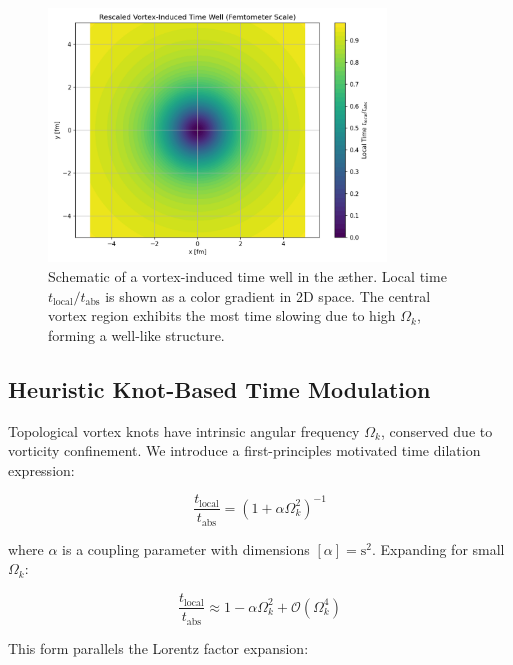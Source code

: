 \begin{figure}[htbp]
    \centering
    \includegraphics[width=0.8\textwidth]{RadialProfileOfLocalTimeDilation_Vortex-Induced_Time_Well}
    \caption{Schematic of a vortex-induced time well in the æther. Local time $t_{\text{local}} / t_{\text{abs}}$ is shown as a color gradient in 2D space. The central vortex region exhibits the most time slowing due to high $\Omega_k$, forming a well-like structure.}
    \label{fig:vortex_time_well}
\end{figure}


\subsection{Heuristic Knot-Based Time Modulation}

Topological vortex knots have intrinsic angular frequency $\Omega_k$, conserved due to vorticity confinement. We introduce a first-principles motivated
time dilation expression:

\begin{equation}
\frac{t_{\text{local}}}{t_{\text{abs}}} = \left(1 + \alpha \Omega_k^2 \right)^{-1}\label{eq:angular_time_dilation}
\end{equation}

where $\alpha$ is a coupling parameter with dimensions $[\alpha] = \text{s}^2$. Expanding for small $\Omega_k$:

\begin{equation}
\frac{t_{\text{local}}}{t_{\text{abs}}} \approx 1 - \alpha \Omega_k^2 + \mathcal{O}(\Omega_k^4)\label{eq:angular_time_dilation_expansion}
\end{equation}

This form parallels the Lorentz factor expansion:

